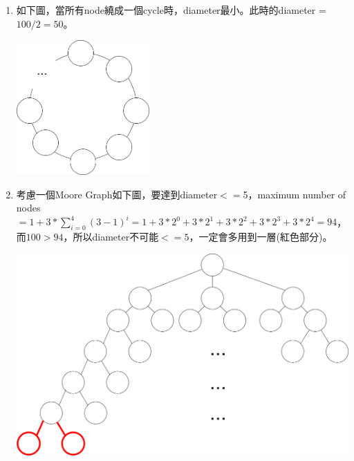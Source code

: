 \documentclass[oneside, 12pt]{article}
\begin{document}
\begin{CJK*}{UTF8}{bkai}
\begin{enumerate}
\newpage

\item
如下圖，當所有node繞成一個cycle時，diameter最小。此時的diameter = $100 / 2 = 50$。
\begin{center}
\includegraphics[width=2in]{problem3}
\end{center}

\item
考慮一個Moore Graph如下圖，要達到diameter$<=$5，maximum number of nodes $= 1 + 3*\sum_{i=0}^{4}(3-1)^i = 1 + 3 * 2 ^ 0 + 3 * 2 ^ 1 + 3 * 2 ^ 2 + 3 * 2 ^ 3 + 3 * 2 ^ 4 = 94$，而$100>94$，所以diameter不可能$<=5$，一定會多用到一層(紅色部分)。
\begin{center}
\includegraphics[width=5in]{problem4}
\end{center}

\end{enumerate}


\end{CJK*}
\end{document}
